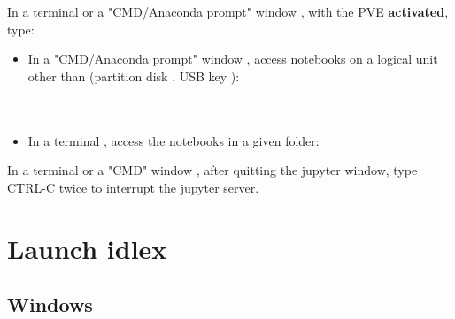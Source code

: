 \documentclass[10pt,serif,mathserif,compress,hyperref={colorlinks}]{beamer}
\begin{document}
\begin{frame}

  \begin{tcolorbox}[title={Launch {\bf jupyter notebook}}]
 
    In a terminal  or a "CMD/Anaconda prompt" window \DarkGray{\footnotesize[Windows]},
      with the  PVE {\bf activated}, type:\\
      \hspace*{10pt}
  \end{tcolorbox}
  
  \begin{tcolorbox}[title={Access notebooks anywhere with {\bf jupyter}}]
    \begin{itemize}
    \item In a "CMD/Anaconda prompt" window \DarkGray{\footnotesize[Windows]}, access notebooks on a logical unit other than 
      (partition disk , USB key ):\\
      \hspace*{10pt}\\
      \hspace*{10pt}\\
    \item In a terminal , access the notebooks in a given folder:\\
      \hspace*{10pt}
    \end{itemize}
  \end{tcolorbox}

  \begin{tcolorbox}[title={Quit {\bf jupyter notebook}}]      
    In a terminal  or a "CMD" window \DarkGray{\footnotesize[Windows]},
    after quitting the jupyter window, type CTRL-C twice to interrupt the jupyter server.
  \end{tcolorbox}  
\end{frame}

\section{Launch idlex}

\subsection{Windows}
\end{document}
